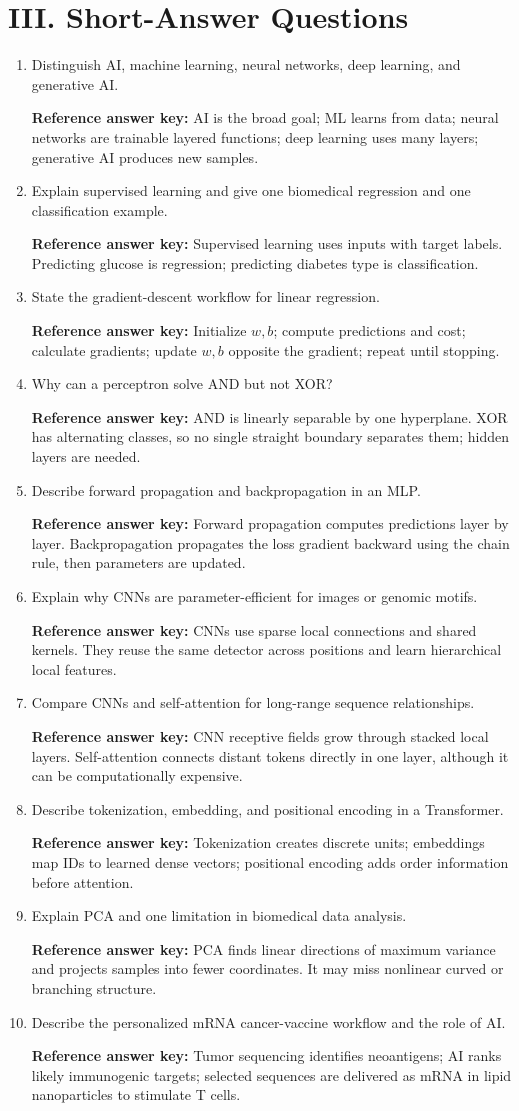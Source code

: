 \documentclass[10pt,a4paper]{article}
\newcommand{\keyans}[1]{\par\textbf{Reference answer key:} #1}
\begin{document}
\section*{III. Short-Answer Questions}
\begin{enumerate}[label=\textbf{\arabic*.},start=91,itemsep=6pt]
\item Distinguish AI, machine learning, neural networks, deep learning, and generative AI.
\keyans{AI is the broad goal; ML learns from data; neural networks are trainable layered functions; deep learning uses many layers; generative AI produces new samples.}
\item Explain supervised learning and give one biomedical regression and one classification example.
\keyans{Supervised learning uses inputs with target labels. Predicting glucose is regression; predicting diabetes type is classification.}
\item State the gradient-descent workflow for linear regression.
\keyans{Initialize $w,b$; compute predictions and cost; calculate gradients; update $w,b$ opposite the gradient; repeat until stopping.}
\item Why can a perceptron solve AND but not XOR?
\keyans{AND is linearly separable by one hyperplane. XOR has alternating classes, so no single straight boundary separates them; hidden layers are needed.}
\item Describe forward propagation and backpropagation in an MLP.
\keyans{Forward propagation computes predictions layer by layer. Backpropagation propagates the loss gradient backward using the chain rule, then parameters are updated.}
\item Explain why CNNs are parameter-efficient for images or genomic motifs.
\keyans{CNNs use sparse local connections and shared kernels. They reuse the same detector across positions and learn hierarchical local features.}
\item Compare CNNs and self-attention for long-range sequence relationships.
\keyans{CNN receptive fields grow through stacked local layers. Self-attention connects distant tokens directly in one layer, although it can be computationally expensive.}
\item Describe tokenization, embedding, and positional encoding in a Transformer.
\keyans{Tokenization creates discrete units; embeddings map IDs to learned dense vectors; positional encoding adds order information before attention.}
\item Explain PCA and one limitation in biomedical data analysis.
\keyans{PCA finds linear directions of maximum variance and projects samples into fewer coordinates. It may miss nonlinear curved or branching structure.}
\item Describe the personalized mRNA cancer-vaccine workflow and the role of AI.
\keyans{Tumor sequencing identifies neoantigens; AI ranks likely immunogenic targets; selected sequences are delivered as mRNA in lipid nanoparticles to stimulate T cells.}
\end{enumerate}
\end{document}
